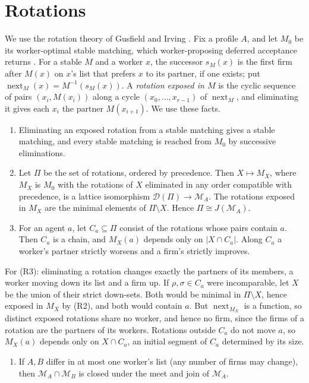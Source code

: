 \documentclass[11pt]{amsart}
\theoremstyle{definition}
\theoremstyle{remark}
\newcommand{\D}{\mathcal D}
\newcommand{\nxt}{\operatorname{next}}
\begin{document}
\section{Rotations}

We use the rotation theory of Gusfield and Irving \cite[Ch.~2--3]{GI}. Fix a profile $A$, and let $M_0$ be its worker-optimal stable matching, which worker-proposing deferred acceptance returns \cite{GS}. For a stable $M$ and a worker $x$, the successor $s_M(x)$ is the first firm after $M(x)$ on $x$'s list that prefers $x$ to its partner, if one exists; put $\nxt_M(x)=M^{-1}(s_M(x))$. A \emph{rotation exposed in $M$} is the cyclic sequence of pairs $(x_i,M(x_i))$ along a cycle $(x_0,\dots,x_{r-1})$ of $\nxt_M$, and eliminating it gives each $x_i$ the partner $M(x_{i+1})$. We use these facts.

\begin{enumerate}[label=(R\arabic*)]
\item Eliminating an exposed rotation from a stable matching gives a stable matching, and every stable matching is reached from $M_0$ by successive eliminations.
\item Let $\Pi$ be the set of rotations, ordered by precedence. Then $X\mapsto M_X$, where $M_X$ is $M_0$ with the rotations of $X$ eliminated in any order compatible with precedence, is a lattice isomorphism $\D(\Pi)\to\mathcal M_A$. The rotations exposed in $M_X$ are the minimal elements of $\Pi\setminus X$. Hence $\Pi\cong J(\mathcal M_A)$.
\item For an agent $a$, let $C_a\subseteq\Pi$ consist of the rotations whose pairs contain $a$. Then $C_a$ is a chain, and $M_X(a)$ depends only on $|X\cap C_a|$. Along $C_a$ a worker's partner strictly worsens and a firm's strictly improves.
\end{enumerate}

For (R3): eliminating a rotation changes exactly the partners of its members, a worker moving down its list and a firm up. If $\rho,\sigma\in C_a$ were incomparable, let $X$ be the union of their strict down-sets. Both would be minimal in $\Pi\setminus X$, hence exposed in $M_X$ by (R2), and both would contain $a$. But $\nxt_{M_X}$ is a function, so distinct exposed rotations share no worker, and hence no firm, since the firms of a rotation are the partners of its workers. Rotations outside $C_a$ do not move $a$, so $M_X(a)$ depends only on $X\cap C_a$, an initial segment of $C_a$ determined by its size.

\begin{enumerate}[label=(R\arabic*),resume]
\item \cite[Theorem~7]{GMRV} If $A,B$ differ in at most one worker's list (any number of firms may change), then $\mathcal M_A\cap\mathcal M_B$ is closed under the meet and join of $\mathcal M_A$.
\end{enumerate}
\end{document}

